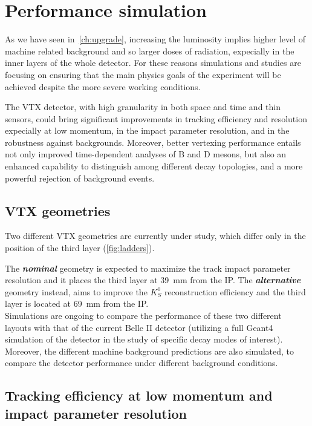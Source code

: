 \section{Performance simulation}


As we have seen in~\autoref{ch:upgrade}, increasing the luminosity implies higher level of machine related background and so larger doses of radiation, expecially in the inner layers of the whole detector. 
For these reasons simulations and studies are focusing on ensuring that the main physics goals of the experiment will be achieved despite the more severe working conditions. 

The VTX detector, with high granularity in both space and time and thin sensors, could bring significant improvements in tracking efficiency and resolution expecially at low momentum, in the impact parameter resolution, and in the robustness against backgrounds. Moreover, better vertexing performance entails not only improved time-dependent analyses of B and D mesons, but also an enhanced capability to distinguish among different decay topologies, and a more powerful rejection of background events.


\subsection{VTX geometries}

Two different VTX geometries are currently under study, which differ only in the position of the third layer (\autoref{fig:ladders}).  

The \textit{\textbf{nominal}} geometry is expected to maximize the track impact parameter resolution and it places the third layer at \SI{39}{mm} from the IP.
The \textit{\textbf{alternative}} geometry instead, aims to improve the $K_{S}^{0}$ reconstruction efficiency and the third layer is located at \SI{69}{mm} from the IP.\\

Simulations are ongoing to compare the performance of these two different layouts with that of the current Belle II detector (utilizing a full Geant4 simulation of the detector in the study of specific decay modes of interest). Moreover, the different machine background predictions are also simulated, to compare the detector performance under different background conditions. 

\subsection{Tracking efficiency at low momentum and impact parameter resolution}

